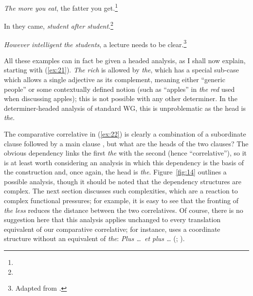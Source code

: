 \documentclass[output=paper
 	        ,biblatex
                ,babelshorthands
                ,newtxmath
                ,draftmode
                ,colorlinks, citecolor=brown
]{langscibook}
\begin{document}
\ex \label{ex:22} \emph{The more you eat}, the fatter you get.\footnote{}

\ex \label{ex:23} In they came, \emph{student after student}.\footnote{}

\ex \label{ex:24} \emph{However intelligent the students}, a lecture needs to be
clear.\footnote{Adapted from .}
\zl

\noindent
All these examples can in fact be given a headed analysis, as I shall now explain, starting with
(\ref{ex:21}). \emph{The rich} is allowed by \emph{the}, which has a special sub-case which allows a
single adjective as its complement, meaning either ``generic people'' or some contextually defined
notion (such as ``apples'' in \emph{the red} used when discussing apples); this is not possible with
any other determiner. In the determiner-headed analysis of standard WG, this is unproblematic as the
head is \emph{the}.

The comparative correlative in (\ref{ex:22}) is clearly a combination of a subordinate clause
followed by a main clause \citep{CJ99a-u}, but what are the heads of the two clauses? The obvious
dependency links the first \emph{the} with the second (hence ``correlative''), so it is at least
worth considering an analysis in which this dependency is the basis of the construction and, once
again, the head is \emph{the}. Figure~\ref{fig:14} outlines a possible analysis, though it should be
noted that the dependency structures are complex. The next section discusses such complexities,
which are a reaction to complex functional pressures; for example, it is easy to see that the
fronting of \emph{the less} reduces the distance between the two correlatives. Of course, there is
no suggestion here that this analysis applies unchanged to every translation equivalent of our
comparative correlative; for instance,  uses a coordinate structure without an
equivalent of \emph{the}: \emph{Plus \dots\ et plus \dots} (\citealt{Abeille:Borsley:08}; ).
\end{document}
